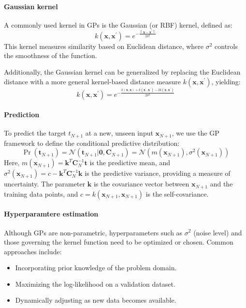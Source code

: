 \paragraph*{Gaussian kernel}
A commonly used kernel in GPs is the Gaussian (or RBF) kernel, defined as:
\[k(\mathbf{x},\mathbf{x}^\prime)=e^{-\frac{\left\lVert \mathbf{x}-\mathbf{x}^\prime\right\rVert}{2\sigma^2} }\]
This kernel measures similarity based on Euclidean distance, where $\sigma^2$ controls the smoothness of the function.

Additionally, the Gaussian kernel can be generalized by replacing the Euclidean distance with a more general kernel-based distance measure $k (\mathbf{x},\mathbf{x}^\prime)$, yielding:
\[k(\mathbf{x},\mathbf{x}^\prime)=e^{-\frac{k (\mathbf{x},\mathbf{x})+k (\mathbf{x}^\prime,\mathbf{x}^\prime)-2k (\mathbf{x},\mathbf{x}^\prime)}{2\sigma^2} }\]

\paragraph*{Prediction}
To predict the target $t_{N+1}$ at a new, unseen input $\mathbf{x}_{N+1}$, we use the GP framework to define the conditional predictive distribution:
\[\Pr(\mathbf{t}_{N+1})=\mathcal{N}(\mathbf{t}_{N+1}|\mathbf{0},\mathbf{C}_{N+1})=\mathcal{N}(m(\mathbf{x}_{N+1}),\sigma^2(\mathbf{x}_{N+1}))\]
Here, $m(\mathbf{x}_{N+1})=\mathbf{k}^T\mathbf{C}_N^{-1}\mathbf{t}$ is the predictive mean, and $\sigma^2(\mathbf{x}_{N+1})=c-\mathbf{k}^T\mathbf{C}_N^{-1}\mathbf{k}$ is the predictive variance, providing a measure of uncertainty.
The parameter $\mathbf{k}$ is the covariance vector between $\mathbf{x}_{N+1}$ and the training data points, and $c=k(\mathbf{x}_{N+1},\mathbf{x}_{N+1})$ is the self-covariance.

\paragraph*{Hyperparamtere estimation}
Although GPs are non-parametric, hyperparameters such as $\sigma^2$ (noise level) and those governing the kernel function need to be optimized or chosen. Common approaches include:
\begin{itemize}
    \item Incorporating prior knowledge of the problem domain.
    \item Maximizing the log-likelihood on a validation dataset.
    \item Dynamically adjusting as new data becomes available.
\end{itemize}

